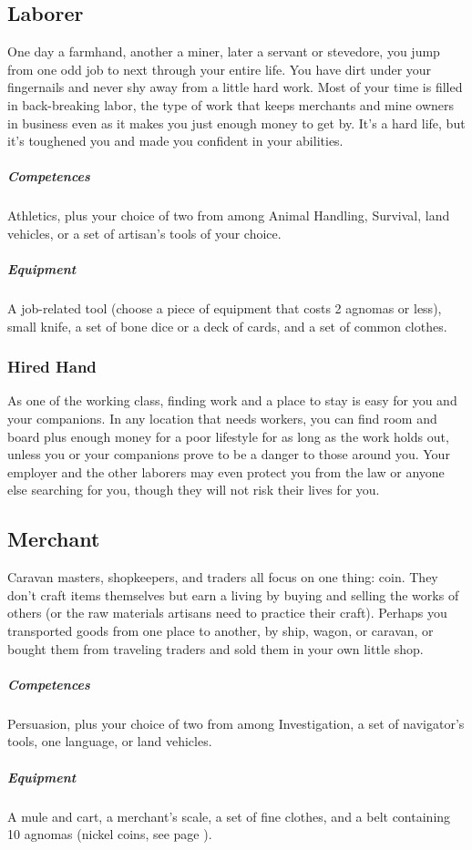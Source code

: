 \subsection*{Laborer} \label{ssec::laborer}
    One day a farmhand, another a miner, later a servant or stevedore, you jump from one odd job to next through your entire life.
    You have dirt under your fingernails and never shy away from a little hard work.
    Most of your time is filled in back-breaking labor, the type of work that keeps merchants and mine owners in business even as it makes you just enough money to get by.
    It’s a hard life, but it’s toughened you and made you confident in your abilities.
    \subparagraph{Competences} Athletics, plus your choice of two from among Animal Handling, Survival, land vehicles, or a set of artisan's tools of your choice.
    \subparagraph{Equipment} A job-related tool (choose a piece of equipment that costs 2 agnomas or less), small knife, a set of bone dice or a deck of cards, and a set of common clothes.
    \subsubsection{Hired Hand}
        As one of the working class, finding work and a place to stay is easy for you and your companions.
        In any location that needs workers, you can find room and board plus enough money for a poor lifestyle for as long as the work holds out, unless you or your companions prove to be a danger to those around you.
        Your employer and the other laborers may even protect you from the law or anyone else searching for you, though they will not risk their lives for you.

\subsection*{Merchant} \label{ssec::merchant}
    Caravan masters, shopkeepers, and traders all focus on one thing: coin.
    They don't craft items themselves but earn a living by buying and selling the works of others (or the raw materials artisans need to practice their craft).
    Perhaps you transported goods from one place to another, by ship, wagon, or caravan, or bought them from traveling traders and sold them in your own little shop.
    \subparagraph{Competences} Persuasion, plus your choice of two from among Investigation, a set of navigator's tools, one language, or land vehicles.
    \subparagraph{Equipment} A mule and cart, a merchant's scale, a set of fine clothes, and a belt containing 10 agnomas (nickel coins, see page \pageref{sec::currency}).

